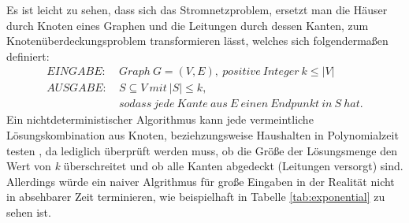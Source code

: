 Es ist leicht zu sehen, dass sich das Stromnetzproblem, ersetzt man die Häuser durch Knoten eines Graphen und die Leitungen durch dessen Kanten,  zum Knotenüberdeckungsproblem transformieren lässt, welches sich folgendermaßen definiert\cite{trees}:
\begin{align*}
EINGABE: &\ Graph\ G=(V,E),\ positive\ Integer\ k\leq |V|\\
AUSGABE: &\ S\subseteq V\ mit\ |S|\leq k,\\
&\ sodass\ jede\ Kante\ aus\ E\ einen\ Endpunkt\ in\ S\ hat.
\end{align*}
Ein nichtdeterministischer Algorithmus kann jede vermeintliche Lösungskombination aus Knoten, beziehzungsweise Haushalten in Polynomialzeit testen \cite{intract}, da lediglich überprüft werden muss, ob die Größe der Lösungsmenge den Wert von \emph{k} überschreitet und ob alle Kanten abgedeckt (Leitungen versorgt) sind.
 Allerdings würde ein naiver Algrithmus für große Eingaben in der Realität nicht in absehbarer Zeit terminieren, wie beispielhaft in Tabelle \ref{tab:exponential} zu sehen ist.
 
